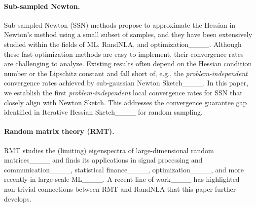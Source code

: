 \paragraph{Sub-sampled Newton.}
Sub-sampled Newton (SSN) methods propose to approximate the Hessian in Newton's method using a small subset of samples, and they have been extensively studied within the fields of ML, RandNLA, and optimization____.
Although these fast optimization methods are easy to implement, their convergence rates are challenging to analyze.
Existing results often depend on the Hessian condition number or the Lipschitz constant and fall short of, e.g., the \emph{problem-independent} convergence rates achieved by sub-gaussian Newton Sketch____.
In this paper, we establish the first \emph{problem-independent} local convergence rates for SSN that closely align with Newton Sketch. 
This addresses the convergence guarantee gap identified in Iterative Hessian Sketch____ for random sampling.



\paragraph{Random matrix theory (RMT).}
RMT studies the (limiting) eigenspectra of large-dimensional random matrices____ and finds its applications in signal processing and communication____, statistical finance____, optimization____, and more recently in large-scale ML____.
A recent line of work____ has highlighted non-trivial connections between RMT and RandNLA that this paper further develops.